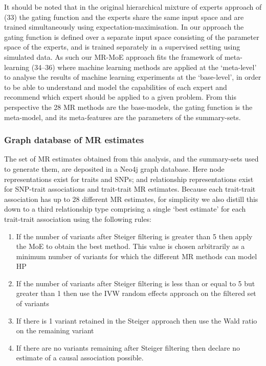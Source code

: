 \documentclass[]{article}
\providecommand{\tightlist}{%
  \setlength{\itemsep}{0pt}\setlength{\parskip}{0pt}}
\begin{document}
It should be noted that in the original hierarchical mixture of experts
approach of (33) the gating function and the experts share the same
input space and are trained simultaneously using
expectation-maximisation. In our approach the gating function is defined
over a separate input space consisting of the parameter space of the
experts, and is trained separately in a supervised setting using
simulated data. As such our MR-MoE approach fits the framework of
meta-learning (34--36) where machine learning methods are applied at the
`meta-level' to analyse the results of machine learning experiments at
the `base-level', in order to be able to understand and model the
capabilities of each expert and recommend which expert should be applied
to a given problem. From this perspective the 28 MR methods are the
base-models, the gating function is the meta-model, and its
meta-features are the parameters of the summary-sets.

\subsubsection{Graph database of MR
estimates}\label{graph-database-of-mr-estimates}

The set of MR estimates obtained from this analysis, and the
summary-sets used to generate them, are deposited in a Neo4j graph
database. Here node representations exist for traits and SNPs; and
relationship representations exist for SNP-trait associations and
trait-trait MR estimates. Because each trait-trait association has up to
28 different MR estimates, for simplicity we also distill this down to a
third relationship type comprising a single `best estimate' for each
trait-trait association using the following rules:

\begin{enumerate}
\def\labelenumi{\arabic{enumi}.}
\tightlist
\item
  If the number of variants after Steiger filtering is greater than 5
  then apply the MoE to obtain the best method. This value is chosen
  arbitrarily as a minimum number of variants for which the different MR
  methods can model HP
\item
  If the number of variants after Steiger filtering is less than or
  equal to 5 but greater than 1 then use the IVW random effects approach
  on the filtered set of variants
\item
  If there is 1 variant retained in the Steiger approach then use the
  Wald ratio on the remaining variant
\item
  If there are no variants remaining after Steiger filtering then
  declare no estimate of a causal association possible.
\end{enumerate}
\end{document}
